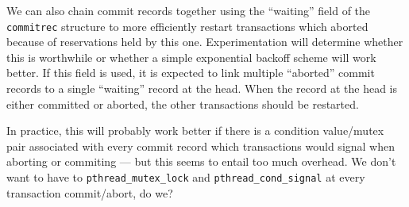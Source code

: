 \documentclass[11pt,notitlepage]{article}
\begin{document}
We can also chain commit records together using the ``waiting'' field
of the \texttt{commitrec} structure to more efficiently restart
transactions which aborted because of reservations held by this
one.  Experimentation will determine whether this is worthwhile or
whether a simple exponential backoff scheme will work better.
If this field is used, it is expected to link multiple ``aborted''
commit records to a single ``waiting'' record at the head.  When the
record at the head is either committed or aborted, the other
transactions should be restarted.

In practice, this will probably work better if there is a condition
value/mutex pair associated with every commit record which
transactions would signal when aborting or commiting --- but this
seems to entail too much overhead.  We don't want to have to
\texttt{pthread\_mutex\_lock} and \texttt{pthread\_cond\_signal} at every
transaction commit/abort, do we?
\end{document}
